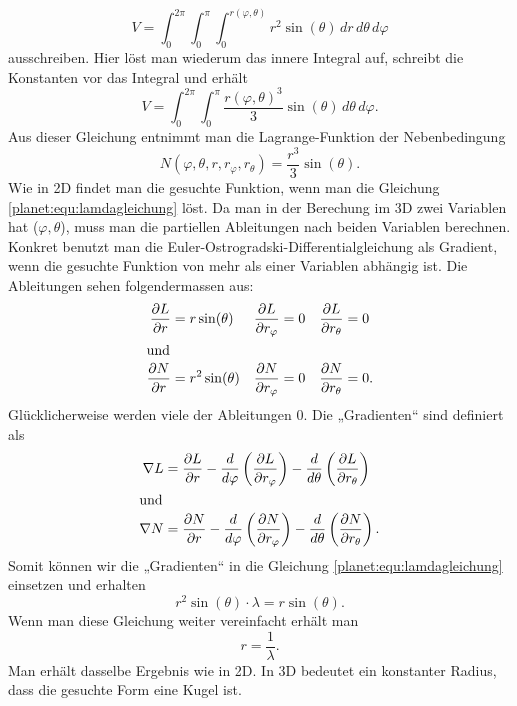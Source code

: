 \begin{equation*}
	V = \int_{0}^{2\pi}\int_{0}^{\pi}\int_{0}^{r(\varphi,\theta)} r^2 \sin (\theta) \, dr \, d\theta \, d\varphi
\end{equation*}
ausschreiben.
Hier löst man wiederum das innere Integral auf, schreibt die Konstanten vor das Integral und erhält
\begin{equation*}
	V = \int_{0}^{2\pi}\int_{0}^{\pi}\frac{r(\varphi,\theta)^3}{3} \sin (\theta) \, d\theta \, d\varphi.
\end{equation*}
Aus dieser Gleichung entnimmt man die Lagrange-Funktion der Nebenbedingung
\begin{equation*}
	N(\varphi,\theta ,r,r_\varphi,r_\theta) = \frac{r^3}{3} \sin (\theta).
\end{equation*}
Wie in 2D findet man die gesuchte Funktion, wenn man die Gleichung \eqref{planet:equ:lamdagleichung} löst.
Da man in der Berechung im 3D zwei Variablen hat (\(\varphi,\theta\)), muss man die partiellen Ableitungen nach beiden Variablen berechnen.
Konkret benutzt man die Euler-Ostrogradski-Differentialgleichung als Gradient, wenn die gesuchte Funktion von mehr als einer Variablen abhängig ist.
Die Ableitungen sehen folgendermassen aus:
\begin{align*}
	\frac{\partial L}{\partial r} &= r  \sin (\theta)& \frac{\partial L}{\partial r_\varphi} &= 0& \frac{\partial L}{\partial r_\theta} &= 0 \\
\intertext{und}
	\frac{\partial N}{\partial r} &= r^2\sin (\theta)&	\frac{\partial N}{\partial r_\varphi} &= 0&	\frac{\partial N}{\partial r_\theta} &= 0.
\end{align*}
Glücklicherweise werden viele der Ableitungen 0.
Die „Gradienten“ sind definiert als
\begin{align*}
	\nabla L &=  \frac{\partial L}{\partial r} -\frac{d}{d\varphi}\left( \frac{\partial L}{\partial r_\varphi} \right) -\frac{d}{d\theta}\left( \frac{\partial L}{\partial r_\theta} \right) \\
\intertext{und}
	\nabla N &=  \frac{\partial N}{\partial r} -\frac{d}{d\varphi}\left( \frac{\partial N}{\partial r_\varphi} \right) -\frac{d}{d\theta}\left( \frac{\partial N}{\partial r_\theta} \right).
\end{align*}
Somit können wir die „Gradienten“ in die Gleichung \eqref{planet:equ:lamdagleichung} einsetzen und erhalten
\begin{equation*}
	r^2\sin (\theta) \cdot \lambda = r \sin (\theta).
\end{equation*}
Wenn man diese Gleichung weiter vereinfacht erhält man
\begin{equation*}
	r = \frac{1}{\lambda}.
\end{equation*}
Man erhält dasselbe Ergebnis wie in 2D.
In 3D bedeutet ein konstanter Radius, dass die gesuchte Form eine Kugel ist.

